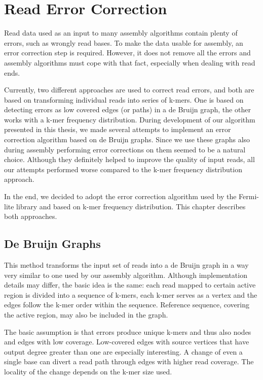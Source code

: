 \chapter{Read Error Correction}
\label{chap:read-error-correction}

Read data used as an input to many assembly algorithms contain plenty of errors, such as wrongly read bases. To make the data usable for assembly, an error correction step is required. However, it does not remove all the errors and assembly algorithms must cope with that fact, especially when dealing with read ends.

Currently, two different approaches are used to correct read errors, and both are based on transforming individual reads into series of k-mers. One is based on detecting errors as low covered edges (or paths) in a de Bruijn graph, the other works with a k-mer frequency distribution. During development of our algorithm presented in this thesis, we made several attempts to implement an error correction algorithm based on de Bruijn graphs. Since we use these graphs also during assembly performing error corrections on them seemed to be a natural choice. Although they definitely helped to improve the quality of input reads, all our attempts performed worse compared to the k-mer frequency distribution approach.

In the end, we decided to adopt the error correction algorithm used by the Fermi-lite library \cite{fermi-lite} and based on k-mer frequency distribution. This chapter describes both approaches.

\section{De Bruijn Graphs}
\label{sec:ec-de-bruin-graphs}

This method transforms the input set of reads into a de Bruijn graph in a way very similar to one used by our assembly algorithm. Although implementation details may differ, the basic idea is the same: each read mapped to certain active region is divided into a sequence of k-mers, each k-mer serves as a vertex and the edges follow the k-mer order within the sequence. Reference sequence, covering the active region, may also be included in the graph.

The basic assumption is that errors produce unique k-mers and thus also
nodes and edges with low coverage. Low-covered edges with source vertices that have output degree greater than one are especially interesting. A change of even a single base can divert a read path through edges with higher read coverage. The locality of the change depends on the k-mer size used.

